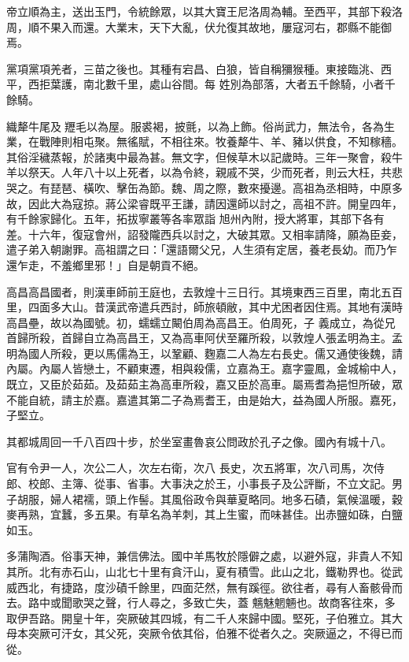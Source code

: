 \begin{pinyinscope}
 帝立順為主，送出玉門，令統餘眾，以其大寶王尼洛周為輔。至西平，其部下殺洛周，順不果入而還。大業末，天下大亂，伏允復其故地，屢寇河右，郡縣不能御焉。



 黨項黨項羌者，三苗之後也。其種有宕昌、白狼，皆自稱獼猴種。東接臨洮、西平，西拒葉護，南北數千里，處山谷間。每
 姓別為部落，大者五千餘騎，小者千餘騎。



 織犛牛尾及𦍩䍽毛以為屋。服裘褐，披氈，以為上飾。俗尚武力，無法令，各為生業，在戰陣則相屯聚。無徭賦，不相往來。牧養犛牛、羊、豬以供食，不知稼穡。其俗淫穢蒸報，於諸夷中最為甚。無文字，但候草木以記歲時。三年一聚會，殺牛羊以祭天。人年八十以上死者，以為令終，親戚不哭，少而死者，則云大枉，共悲哭之。有琵琶、橫吹、擊缶為節。魏、周之際，數來擾邊。高祖為丞相時，中原多故，因此大為寇掠。蔣公梁睿既平王謙，請因還師以討之，高祖不許。開皇四年，有千餘家歸化。五年，拓拔寧叢等各率眾詣
 旭州內附，授大將軍，其部下各有差。十六年，復寇會州，詔發隴西兵以討之，大破其眾。又相率請降，願為臣妾，遣子弟入朝謝罪。高祖謂之曰：「還語爾父兄，人生須有定居，養老長幼。而乃乍還乍走，不羞鄉里邪！」自是朝貢不絕。



 高昌高昌國者，則漢車師前王庭也，去敦煌十三日行。其境東西三百里，南北五百里，四面多大山。昔漢武帝遣兵西討，師旅頓敝，其中尤困者因住焉。其地有漢時高昌壘，故以為國號。初，蠕蠕立闞伯周為高昌王。伯周死，子
 義成立，為從兄首歸所殺，首歸自立為高昌王，又為高車阿伏至羅所殺，以敦煌人張孟明為主。孟明為國人所殺，更以馬儒為王，以鞏顧、麴嘉二人為左右長史。儒又通使後魏，請內屬。內屬人皆戀土，不顧東遷，相與殺儒，立嘉為王。嘉字靈鳳，金城榆中人，既立，又臣於茹茹。及茹茹主為高車所殺，嘉又臣於高車。屬焉耆為挹怛所破，眾不能自統，請主於嘉。嘉遣其第二子為焉耆王，由是始大，益為國人所服。嘉死，子堅立。



 其都城周回一千八百四十步，於坐室畫魯哀公問政於孔子之像。國內有城十八。



 官有令尹一人，次公二人，次左右衛，次八
 長史，次五將軍，次八司馬，次侍郎、校郎、主簿、從事、省事。大事決之於王，小事長子及公評斷，不立文記。男子胡服，婦人裙襦，頭上作髻。其風俗政令與華夏略同。地多石磧，氣候溫暖，穀麥再熟，宜蠶，多五果。有草名為羊刺，其上生蜜，而味甚佳。出赤鹽如硃，白鹽如玉。



 多蒲陶酒。俗事天神，兼信佛法。國中羊馬牧於隱僻之處，以避外寇，非貴人不知其所。北有赤石山，山北七十里有貪汗山，夏有積雪。此山之北，鐵勒界也。從武威西北，有捷路，度沙磧千餘里，四面茫然，無有蹊徑。欲往者，尋有人畜骸骨而去。路中或聞歌哭之聲，行人尋之，多致亡失，蓋
 魑魅魍魎也。故商客往來，多取伊吾路。開皇十年，突厥破其四城，有二千人來歸中國。堅死，子伯雅立。其大母本突厥可汗女，其父死，突厥令依其俗，伯雅不從者久之。突厥逼之，不得已而從。




\end{pinyinscope}
